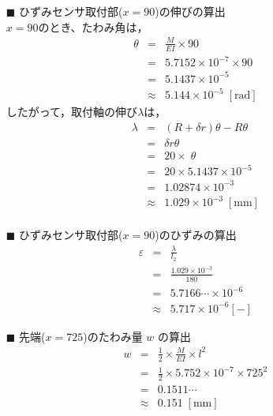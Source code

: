 \documentclass[twocolumn,a4j]{jsarticle}
\begin{document}
\begin{itemize}
    \item [$\blacksquare$] ひずみセンサ取付部($x=90$)の伸びの算出\\
    $x = 90$のとき、たわみ角は，
    \begin{eqnarray*}
        \theta &=& \frac{M}{EI} × 90\\
        &=& 5.7152 × 10^{-7} × 90\\
        &=& 5.1437 × 10^{-5}\\
        &\approx& 5.144 × 10^{-5} \;\left[\mathrm{rad}\right]
    \end{eqnarray*}
    したがって，取付軸の伸び$\lambda$は，
    \begin{eqnarray*}
        \lambda &=& \left(R+\delta r\right)\theta - R\theta\\
        &=& \delta r \theta\\
        &=& 20 × \;\theta\\
        &=& 20 × 5.1437 × 10^{-5}\\
        &=& 1.02874 × 10^{-3}\\
        &\approx& 1.029 × 10^{-3} \;\left[\mathrm{mm}\right]\\
    \end{eqnarray*}
    \item [$\blacksquare$] ひずみセンサ取付部($x=90$)のひずみの算出
        \begin{eqnarray*}
            \varepsilon &=& \frac{\lambda}{l_2}\\
            &=& \frac{1.029 × 10^{-3}}{180}\\
            &=& 5.7166 \cdots × 10^{-6}\\
            &\approx& 5.717 × 10^{-6} \left[\mathrm{-}\right]
        \end{eqnarray*} 
    \item [$\blacksquare$] 先端($x=725$)のたわみ量 $w$ の算出
    \begin{eqnarray*}
        w &=& \frac{1}{2} × \frac{M}{EI} × l^2\\
        &=& \frac{1}{2} × 5.752 × 10^{-7} × 725^2\\
        &=& 0.1511 \cdots\\
        &\approx& 0.151 \;\left[\mathrm{mm}\right]
    \end{eqnarray*} 
\end{itemize}
\end{document}
